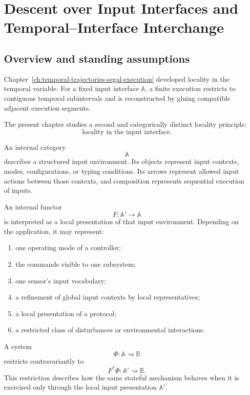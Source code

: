 \chapter{Descent over Input Interfaces and Temporal--Interface Interchange}
\label{ch:descent-input-interfaces}

\section{Overview and standing assumptions}
\label{sec:interface-descent-overview}

Chapter~\ref{ch:temporal-trajectories-segal-execution} developed locality in
the temporal variable. For a fixed input interface \(\mathbb A\), a finite
execution restricts to contiguous temporal subintervals and is reconstructed
by gluing compatible adjacent execution segments.

The present chapter studies a second and categorically distinct locality
principle:
\[
    \text{locality in the input interface}.
\]

An internal category
\[
    \mathbb A
\]
describes a structured input environment. Its objects represent input
contexts, modes, configurations, or typing conditions. Its arrows represent
allowed input actions between those contexts, and composition represents
sequential execution of inputs.

An internal functor
\[
    F:\mathbb A'\to\mathbb A
\]
is interpreted as a local presentation of that input environment. Depending on
the application, it may represent:
\begin{enumerate}
    \item one operating mode of a controller;
    \item the commands visible to one subsystem;
    \item one sensor's input vocabulary;
    \item a refinement of global input contexts by local representatives;
    \item a local presentation of a protocol;
    \item a restricted class of disturbances or environmental interactions.
\end{enumerate}

A system
\[
    \Phi:\mathbb A\rightsquigarrow\mathbb B
\]
restricts contravariantly to
\[
    F^\ast\Phi:
    \mathbb A'\rightsquigarrow\mathbb B.
\]
This restriction describes how the same stateful mechanism behaves when it is
exercised only through the local input presentation \(\mathbb A'\).

